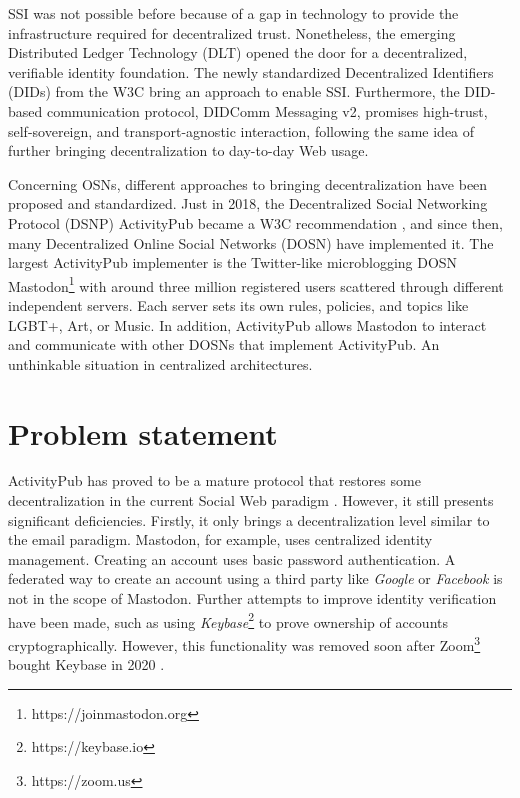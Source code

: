 SSI was not possible before because of a gap in technology to provide the infrastructure required for decentralized trust. Nonetheless, the emerging Distributed Ledger Technology (DLT) opened the door for a decentralized, verifiable identity foundation. The newly standardized Decentralized Identifiers (DIDs) from the W3C bring an approach to enable SSI. Furthermore, the DID-based communication protocol, DIDComm Messaging v2, promises high-trust, self-sovereign, and transport-agnostic interaction, following the same idea of further bringing decentralization to day-to-day Web usage.

Concerning OSNs, different approaches to bringing decentralization have been proposed and standardized. Just in 2018, the Decentralized Social Networking Protocol (DSNP) ActivityPub became a W3C recommendation \cite{lemmer-webber_tallon_guy_prodromou_2018}, and since then, many Decentralized Online Social Networks (DOSN) have implemented it. The largest ActivityPub implementer is the Twitter-like microblogging DOSN Mastodon\footnote{https://joinmastodon.org} with around three million registered users scattered through different independent servers. Each server sets its own rules, policies, and topics like LGBT+, Art, or Music. In addition, ActivityPub allows Mastodon to interact and communicate with other DOSNs that implement ActivityPub. An unthinkable situation in centralized architectures. 


\section{Problem statement}
 
 ActivityPub has proved to be a mature protocol that restores some decentralization in the current Social Web paradigm \cite{webber_sporny_2017}.  However, it still presents significant deficiencies. Firstly, it only brings a decentralization level similar to the email paradigm. Mastodon, for example, uses centralized identity management. Creating an account uses basic password authentication. A federated way to create an account using a third party like \emph{Google} or \emph{Facebook} is not in the scope of Mastodon. Further attempts to improve identity verification have been made, such as using \emph{Keybase}\footnote{https://keybase.io} to prove ownership of accounts cryptographically. However, this functionality was removed soon after Zoom\footnote{https://zoom.us} bought Keybase in 2020 \cite{rochko_2021}. 

